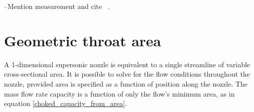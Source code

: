 \documentclass[11pt, twoside]{report}
\begin{document}
--Mention measurement and cite ~\cite{burdett_capacity_measurement}.





\chapter{Geometric throat area}






A 1-dimensional supersonic nozzle is equivalent to a single streamline of variable cross-sectional area. It is possible to solve for the flow conditions throughout the nozzle, provided area is specified as a function of position along the nozzle. The mass flow rate capacity is a function of only the flow's minimum area, as in equation \ref{choked_capacity_from_area}.
\end{document}
